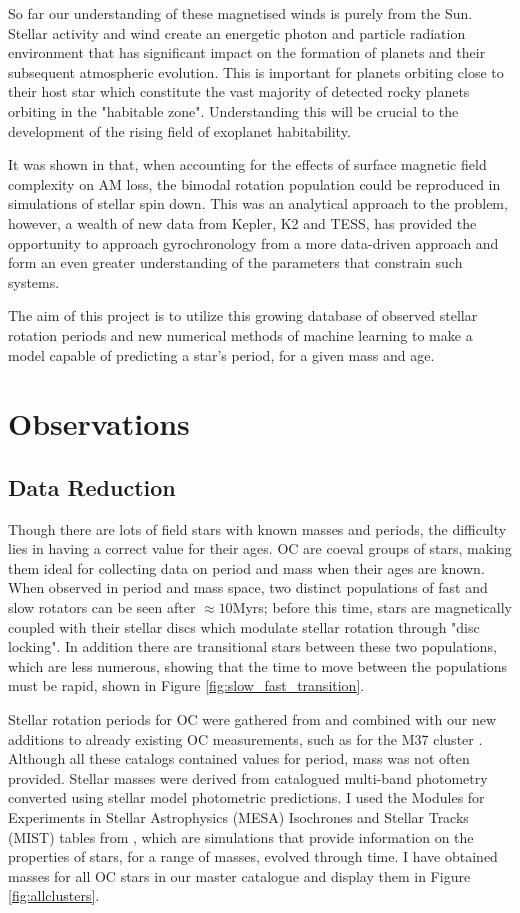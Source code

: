 \documentclass[fleqn,usenatbib]{mnras}
\begin{document}
So far our understanding of these magnetised winds is purely from the Sun.
Stellar activity and wind create an energetic photon and particle radiation environment that has significant impact on the formation of planets and their subsequent atmospheric evolution.
This is important for planets orbiting close to their host star which constitute the vast majority of detected rocky planets orbiting in the "habitable zone".
Understanding this will be crucial to the development of the rising field of exoplanet habitability.

It was shown in \cite{Garraffo_2018} that, when accounting for the effects of surface magnetic field complexity on AM loss, the bimodal rotation population could be reproduced in simulations of stellar spin down.
This was an analytical approach to the problem, however, a wealth of new data from Kepler, K2 and TESS, has provided the opportunity to approach gyrochronology from a more data-driven approach and form an even greater understanding of the parameters that constrain such systems.

The aim of this project is to utilize this growing database of observed stellar rotation periods and new numerical methods of machine learning to make a model capable of predicting a star's period, for a given mass and age.

\section{Observations}
\subsection{Data Reduction}
Though there are lots of field stars with known masses and periods, the difficulty lies in having a correct value for their ages.
OC are coeval groups of stars, making them ideal for collecting data on period and mass when their ages are known.
When observed in period and mass space, two distinct populations of fast and slow rotators can be seen after $\approx 10$Myrs; before this time, stars are magnetically coupled with their stellar discs which modulate stellar rotation through "disc locking". 
In addition there are transitional stars between these two populations, which are less numerous, showing that the time to move between the populations must be rapid, shown in Figure \ref{fig:slow_fast_transition}.

Stellar rotation periods for OC were gathered from \cite{beuther2014protostars} and combined with our new additions to already existing OC measurements, such as for the M37 cluster \cite{chang}.
Although all these catalogs contained values for period, mass was not often provided.
Stellar masses were derived from catalogued multi-band photometry converted using stellar model photometric predictions. 
I used the Modules for Experiments in Stellar Astrophysics (MESA) Isochrones and Stellar Tracks (MIST) tables from \cite{Choi_2016}, which are simulations that provide information on the properties of stars, for a range of masses, evolved through time.
I have obtained masses for all OC stars in our master catalogue and display them in Figure \ref{fig:allclusters}.
\end{document}
